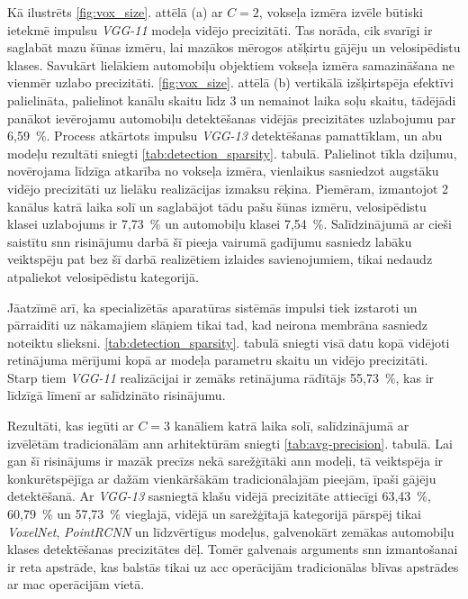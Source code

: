 Kā ilustrēts \ref{fig:vox_size}. attēlā (a) ar \(C=2\), vokseļa izmēra izvēle būtiski ietekmē impulsu \textit{VGG-11} modeļa
vidējo precizitāti. Tas norāda, cik svarīgi ir saglabāt mazu šūnas izmēru, lai mazākos mērogos atšķirtu gājēju un
velosipēdistu klases. Savukārt lielākiem automobiļu objektiem vokseļa izmēra samazināšana ne vienmēr uzlabo precizitāti.
\ref{fig:vox_size}. attēlā (b) vertikālā izšķirtspēja efektīvi palielināta, palielinot kanālu skaitu līdz 3 un nemainot laika
soļu skaitu, tādējādi panākot ievērojamu automobiļu detektēšanas vidējās precizitātes uzlabojumu par 6,59~\%. Process
atkārtots impulsu \textit{VGG-13} detektēšanas pamattīklam, un abu modeļu rezultāti sniegti \ref{tab:detection_sparsity}.
tabulā. Palielinot tīkla dziļumu, novērojama līdzīga atkarība no vokseļa izmēra, vienlaikus sasniedzot augstāku vidējo
precizitāti uz lielāku realizācijas izmaksu rēķina. Piemēram, izmantojot 2 kanālus katrā laika solī un saglabājot tādu pašu
šūnas izmēru, velosipēdistu klasei uzlabojums ir 7,73~\% un automobiļu klasei 7,54~\%. Salīdzinājumā ar cieši saistītu
\Gls{snn}
risinājumu darbā \cite{Zhou2020} šī pieeja vairumā gadījumu sasniedz labāku veiktspēju pat bez šī darbā realizētiem
izlaides savienojumiem, tikai nedaudz atpaliekot velosipēdistu kategorijā.

Jāatzīmē arī, ka specializētās aparatūras sistēmās impulsi tiek izstaroti un pārraidīti uz nākamajiem slāņiem tikai tad, kad
neirona membrāna sasniedz noteiktu slieksni.
\ref{tab:detection_sparsity}. tabulā sniegti visā datu kopā vidējoti retinājuma mērījumi kopā ar modeļa parametru
skaitu un vidējo precizitāti. Starp tiem \textit{VGG-11} realizācijai ir zemāks retinājuma rādītājs 55,73~\%, kas ir
līdzīgā līmenī ar salīdzināto risinājumu.

Rezultāti, kas iegūti ar \(C=3\) kanāliem katrā laika solī, salīdzinājumā ar izvēlētām tradicionālām \Gls{ann} arhitektūrām sniegti
\ref{tab:avg-precision}. tabulā. Lai gan šī risinājums ir mazāk precīzs nekā sarežģītāki \Gls{ann} modeļi, tā veiktspēja ir
konkurētspējīga ar dažām vienkāršākām tradicionālajām pieejām, īpaši gājēju detektēšanā. Ar \textit{VGG-13} sasniegtā klašu
vidējā precizitāte attiecīgi 63,43~\%, 60,79~\% un 57,73~\% vieglajā, vidējā un sarežģītajā kategorijā pārspēj tikai
\textit{VoxelNet}, \textit{PointRCNN} un līdzvērtīgus modeļus, galvenokārt zemākas automobiļu klases detektēšanas
precizitātes dēļ. Tomēr galvenais arguments \Gls{snn} izmantošanai ir reta apstrāde, kas balstās tikai uz \Gls{acc}
operācijām tradicionālas blīvas apstrādes ar \Gls{mac} operācijām vietā.

